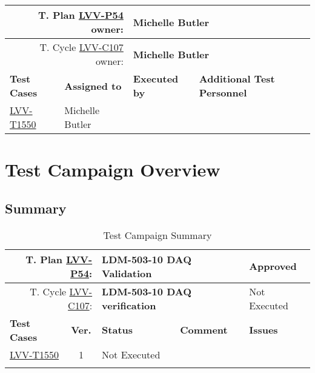 \documentclass[DM,lsstdraft,STR,toc]{lsstdoc}
\begin{document}
{\small
\begin{longtable}{p{3cm}p{3cm}p{3cm}p{6cm}}
\hline
\multicolumn{2}{r}{T. Plan \href{https://jira.lsstcorp.org/secure/Tests.jspa\#/testPlan/LVV-P54}{LVV-P54} owner:} &
\multicolumn{2}{l}{\textbf{ Michelle Butler } }\\\hline
\multicolumn{2}{r}{T. Cycle \href{https://jira.lsstcorp.org/secure/Tests.jspa\#/testCycle/LVV-C107}{LVV-C107} owner:} &
\multicolumn{2}{l}{\textbf{
Michelle Butler }
} \\\hline
\textbf{Test Cases} & \textbf{Assigned to} & \textbf{Executed by} & \textbf{Additional Test Personnel} \\ \hline
\href{https://jira.lsstcorp.org/secure/Tests.jspa#/testCase/LVV-T1550}{LVV-T1550}
& {\small Michelle Butler } & {\small  } &
\begin{minipage}[]{6cm}
\smallskip
{\small  }
\medskip
\end{minipage}
\\ \hline
\end{longtable}
}

\newpage

\section{Test Campaign Overview}
\label{sect:overview}

\subsection{Summary}
\label{sect:summarytable}

{\small
\begin{longtable}{p{2cm}cp{2.3cm}p{8.6cm}p{2.3cm}}
\toprule
\multicolumn{2}{r}{ T. Plan \href{https://jira.lsstcorp.org/secure/Tests.jspa\#/testPlan/LVV-P54}{LVV-P54}:} &
\multicolumn{2}{p{10.9cm}}{\textbf{ LDM-503-10 DAQ Validation }} & Approved \\\hline
\multicolumn{2}{r}{ T. Cycle \href{https://jira.lsstcorp.org/secure/Tests.jspa\#/testCycle/LVV-C107}{LVV-C107}:} &
\multicolumn{2}{p{10.9cm}}{\textbf{ LDM-503-10 DAQ verification }} & Not Executed \\\hline
\textbf{Test Cases} &  \textbf{Ver.} & \textbf{Status} & \textbf{Comment} & \textbf{Issues} \\\toprule
\href{https://jira.lsstcorp.org/secure/Tests.jspa#/testCase/LVV-T1550}{LVV-T1550}
&  1
& Not Executed &
\begin{minipage}[]{9cm}
\smallskip

\medskip
\end{minipage}
&
\\\hline
\caption{Test Campaign Summary}
\label{table:summary}
\end{longtable}
}
\end{document}
